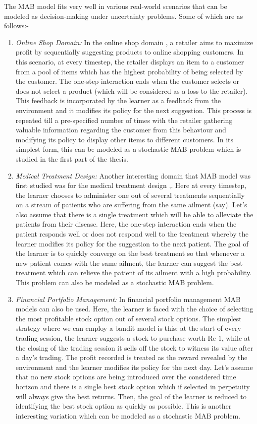 The MAB model fits very well in various real-world scenarios that can be modeled as decision-making under uncertainty  problems. Some of which are as follows:-
\begin{enumerate}
\item \emph{Online Shop Domain:} In the online shop domain \citep{ghavamzadeh2015bayesian}, a retailer aims to maximize profit by sequentially suggesting products to online shopping customers. In this scenario, at every timestep, the retailer displays an item to a customer from a pool of items which has the highest probability of being selected by the customer. The one-step interaction ends when the customer selects or does not select a product (which will be considered as a loss to the retailer). This feedback is incorporated by the learner as a feedback from the environment and it modifies its policy for the next suggestion. This process is repeated till a pre-specified number of times with the retailer gathering valuable information regarding the customer from this behaviour and modifying its policy to display other items to different customers. In its simplest form,  this can be modeled as a stochastic MAB problem which is studied in the first part of the thesis.
\item \emph{Medical Treatment Design:} Another interesting domain that MAB model was first studied was for the medical treatment design \citep{thompson1933likelihood},\citep{thompson1935theory}. Here at every timestep, the learner chooses to administer one out of several treatments sequentially on a stream of patients who are suffering from the same ailment (say). Let's also assume that there is a single treatment which will be able to alleviate the patients from their disease. Here, the one-step interaction ends when the patient responds well or does not respond well to the treatment whereby the learner modifies its policy for the suggestion to the next patient. The goal of the learner is to quickly converge on the best treatment so that whenever a new patient comes with the same ailment, the learner can suggest the best treatment which can relieve the patient of its ailment with a high probability. This problem can also be modeled as a stochastic MAB problem.
\item \emph{Financial Portfolio Management:} In financial portfolio management MAB models can also be used. Here, the learner is faced with the choice of selecting the most profitable stock option out of several stock options. The simplest strategy where we can employ a bandit model is this; at the start of every trading session, the learner suggests a stock to purchase worth Re $1$, while at the closing of the trading session it sells off the stock to witness its value after a day's trading. The profit recorded is treated as the reward revealed by the environment and the learner modifies its policy for the next day. Let's assume that no new stock options are being introduced over the considered time horizon and there is a single best stock option which if selected in perpetuity will always give the best returns. Then, the goal of the learner is reduced to identifying the best stock option as quickly as possible. This is another interesting variation which can be modeled as a stochastic MAB problem.

\end{enumerate}
